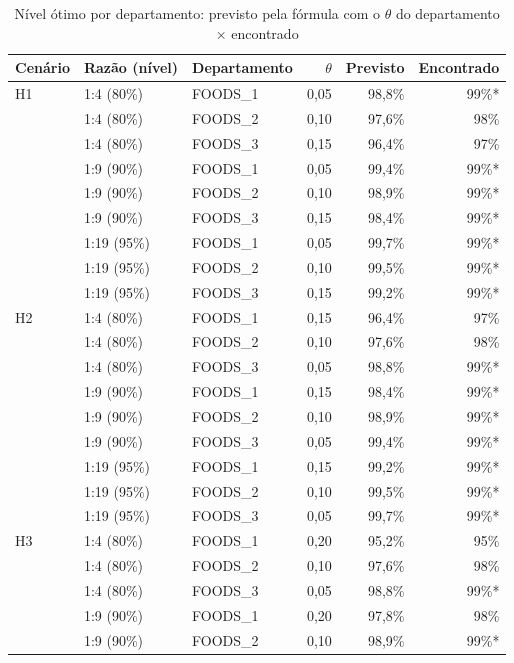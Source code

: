 \begin{table}[htbp]
\centering
\small
\caption{Nível ótimo por departamento: previsto pela fórmula com o $\theta$ do departamento × encontrado}
\label{tab:het_nivel_departamento}
\begin{tabular}{lllrrr}
\toprule
Cenário & Razão (nível) & Departamento & $\theta$ & Previsto & Encontrado \\
\midrule
H1 & 1:4 (80\%) & FOODS\_1 & 0,05 & 98,8\% & 99\%* \\
 & 1:4 (80\%) & FOODS\_2 & 0,10 & 97,6\% & 98\% \\
 & 1:4 (80\%) & FOODS\_3 & 0,15 & 96,4\% & 97\% \\
 & 1:9 (90\%) & FOODS\_1 & 0,05 & 99,4\% & 99\%* \\
 & 1:9 (90\%) & FOODS\_2 & 0,10 & 98,9\% & 99\%* \\
 & 1:9 (90\%) & FOODS\_3 & 0,15 & 98,4\% & 99\%* \\
 & 1:19 (95\%) & FOODS\_1 & 0,05 & 99,7\% & 99\%* \\
 & 1:19 (95\%) & FOODS\_2 & 0,10 & 99,5\% & 99\%* \\
 & 1:19 (95\%) & FOODS\_3 & 0,15 & 99,2\% & 99\%* \\
\addlinespace
H2 & 1:4 (80\%) & FOODS\_1 & 0,15 & 96,4\% & 97\% \\
 & 1:4 (80\%) & FOODS\_2 & 0,10 & 97,6\% & 98\% \\
 & 1:4 (80\%) & FOODS\_3 & 0,05 & 98,8\% & 99\%* \\
 & 1:9 (90\%) & FOODS\_1 & 0,15 & 98,4\% & 99\%* \\
 & 1:9 (90\%) & FOODS\_2 & 0,10 & 98,9\% & 99\%* \\
 & 1:9 (90\%) & FOODS\_3 & 0,05 & 99,4\% & 99\%* \\
 & 1:19 (95\%) & FOODS\_1 & 0,15 & 99,2\% & 99\%* \\
 & 1:19 (95\%) & FOODS\_2 & 0,10 & 99,5\% & 99\%* \\
 & 1:19 (95\%) & FOODS\_3 & 0,05 & 99,7\% & 99\%* \\
\addlinespace
H3 & 1:4 (80\%) & FOODS\_1 & 0,20 & 95,2\% & 95\% \\
 & 1:4 (80\%) & FOODS\_2 & 0,10 & 97,6\% & 98\% \\
 & 1:4 (80\%) & FOODS\_3 & 0,05 & 98,8\% & 99\%* \\
 & 1:9 (90\%) & FOODS\_1 & 0,20 & 97,8\% & 98\% \\
 & 1:9 (90\%) & FOODS\_2 & 0,10 & 98,9\% & 99\%* \\

\end{tabular}
\end{table}

